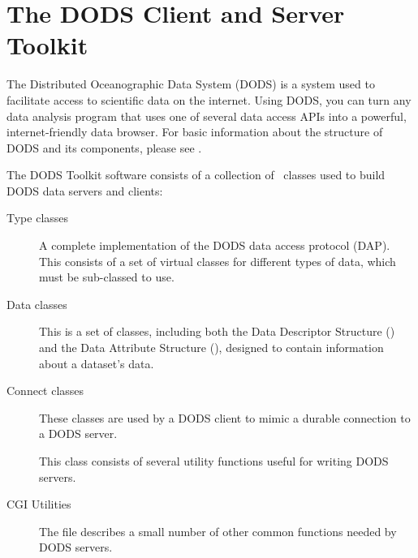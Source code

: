 %
%
%
%
%
%
%
%
%
%

\chapter{The DODS Client and Server Toolkit}
\label{tk,overview}

The Distributed Oceanographic Data System (DODS) is a system used to
facilitate access to scientific data on the internet.  Using DODS, you
can turn any data analysis program that uses one of several data
access APIs into a powerful, internet-friendly data browser.  For basic
information about the structure of DODS and its components, please see
\OPDuser. 

The DODS Toolkit software consists of a collection of \Cpp\ classes used
to build DODS data servers and clients:

\begin{description}
\item[Type classes] A complete implementation of the DODS data access
  protocol (DAP).  This consists of a set of virtual classes for
  different types of data, which must be sub-classed to use.
  
\item[Data classes] This is a set of classes, including both the Data
  Descriptor Structure () and the Data Attribute Structure
  (), designed to contain information about a dataset's
  data.

\item[Connect classes] These classes are used by a DODS client to
  mimic a durable connection to a DODS server.

\item[] This class consists of several utility
  functions useful for writing DODS servers.

\item[CGI Utilities] The file  describes a small
  number of other common functions needed by DODS servers.

\end{description}

